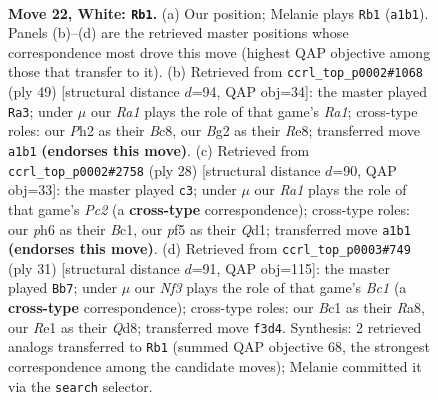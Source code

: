 \documentclass[11pt]{article}
\begin{document}
\begin{figure}[p]
\label{fig:thought-m40}
\end{figure}

\clearpage

\begin{figure}[p]\centering
\begin{subfigure}{0.46\textwidth}\centering
\resizebox{\linewidth}{!}{%
\newchessgame
\chessboard[
  setfen={1rbq1r1k/p1n1b3/6pp/2pp1p1n/P4P2/1P3NP1/Q2NP1BP/R1B1R2K w - - 0 22},
  showmover=false,
  pgfstyle=straightmove, color=movearrow, markmove={a1-b1}
]}
\caption{}
\end{subfigure}\hfill
\begin{subfigure}{0.46\textwidth}\centering
\resizebox{\linewidth}{!}{%
\newchessgame
\chessboard[
  setfen={r1b1r1k1/1pq2pb1/2ppnnpp/8/1PP1P3/2N1BNPP/2Q1RPB1/3R2K1 b - - 2 25},
  showmover=false,
  pgfstyle=straightmove, color=movearrow, markmove={a8-a3}
]}
\caption{}
\end{subfigure}
\\[4pt]
\begin{subfigure}{0.46\textwidth}\centering
\resizebox{\linewidth}{!}{%
\newchessgame
\chessboard[
  setfen={r2qr1k1/1b2bppp/p7/1ppnN3/8/1P1P1N1P/1PP2PP1/R1BQR1K1 w - - 1 15},
  showmover=false,
  pgfstyle=straightmove, color=movearrow, markmove={c2-c3}
]}
\caption{}
\end{subfigure}\hfill
\begin{subfigure}{0.46\textwidth}\centering
\resizebox{\linewidth}{!}{%
\newchessgame
\chessboard[
  setfen={r1bqrbk1/3n1pp1/1p3n1p/pP2p3/2N1P3/2PP1N2/4B1PP/R1BQ1R1K b - - 0 16},
  showmover=false,
  pgfstyle=straightmove, color=movearrow, markmove={c8-b7}
]}
\caption{}
\end{subfigure}
\caption{\textbf{Move 22, White: \texttt{Rb1}.} (a) Our position; Melanie plays \texttt{Rb1} (\texttt{a1b1}). Panels (b)--(d) are the retrieved master positions whose correspondence most drove this move (highest QAP objective among those that transfer to it). (b) Retrieved from \texttt{ccrl\_top\_p0002\#1068} (ply 49) [structural distance $d$=94, QAP obj=34]: the master played \texttt{Ra3}; under $\mu$ our \emph{Ra1} plays the role of that game's \emph{Ra1}; cross-type roles: our \emph{P}h2 as their \emph{B}c8, our \emph{B}g2 as their \emph{R}e8; transferred move \texttt{a1b1} \textbf{(endorses this move)}. (c) Retrieved from \texttt{ccrl\_top\_p0002\#2758} (ply 28) [structural distance $d$=90, QAP obj=33]: the master played \texttt{c3}; under $\mu$ our \emph{Ra1} plays the role of that game's \emph{Pc2} (a \textbf{cross-type} correspondence); cross-type roles: our \emph{p}h6 as their \emph{B}c1, our \emph{p}f5 as their \emph{Q}d1; transferred move \texttt{a1b1} \textbf{(endorses this move)}. (d) Retrieved from \texttt{ccrl\_top\_p0003\#749} (ply 31) [structural distance $d$=91, QAP obj=115]: the master played \texttt{Bb7}; under $\mu$ our \emph{Nf3} plays the role of that game's \emph{Bc1} (a \textbf{cross-type} correspondence); cross-type roles: our \emph{B}c1 as their \emph{R}a8, our \emph{R}e1 as their \emph{Q}d8; transferred move \texttt{f3d4}. Synthesis: 2 retrieved analogs transferred to \texttt{Rb1} (summed QAP objective 68, the strongest correspondence among the candidate moves); Melanie committed it via the \texttt{search} selector.}

\end{figure}
\end{document}
